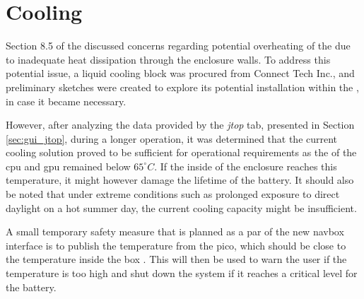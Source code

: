 \section{Cooling}
Section 8.5 of the \preproject discussed concerns regarding potential overheating of the \sr due to inadequate heat dissipation through the enclosure walls.
To address this potential issue, a liquid cooling block was procured from Connect Tech Inc., and preliminary sketches were created to explore its potential installation within the \sr, in case it became necessary.

However, after analyzing the data provided by the \textit{jtop} tab, presented in Section \ref{sec:gui_jtop}, during a longer operation, it was determined that the current cooling solution proved to be sufficient for operational requirements as the of the \gls{cpu} and \gls{gpu} remained below $65^{\circ}C$.
If the inside of the enclosure reaches this temperature, it might however damage the lifetime of the battery.
It should also be noted that under extreme conditions such as prolonged exposure to direct daylight on a hot summer day, the current cooling capacity might be insufficient.

A small temporary safety measure that is planned as a par of  the new \gls{navbox} interface is to publish the temperature from the \gls{pico}, which should be close to the temperature inside the box \cite[71]{PicoSDK}.
This will then be used to warn the user if the temperature is too high and shut down the system if it reaches a critical level for the battery.